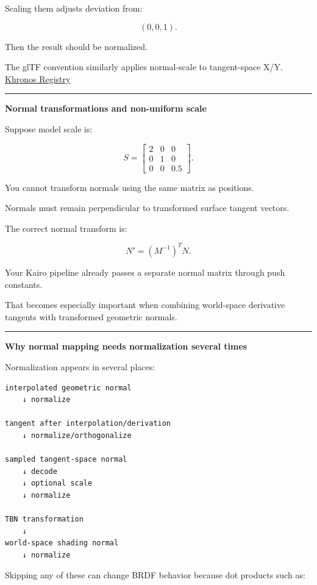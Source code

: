 Scaling them adjusts deviation from:

\[
(0,0,1).
\]

Then the result should be normalized.

The glTF convention similarly applies normal-scale to tangent-space X/Y. \href{https://registry.khronos.org/glTF/specs/2.0/glTF-2.0.html?utm_source=chatgpt.com}{Khronos Registry}

\begin{center}\rule{0.5\linewidth}{0.5pt}\end{center}

\textbf{Normal transformations and non-uniform scale}

Suppose model scale is:

\[
S=
\begin{bmatrix}
2&0&0\\
0&1&0\\
0&0&0.5
\end{bmatrix}.
\]

You cannot transform normals using the same matrix as positions.

Normals must remain perpendicular to transformed surface tangent vectors.

The correct normal transform is:

\[
\boxed{
N'
=
(M^{-1})^T N.
}
\]

Your Kairo pipeline already passes a separate normal matrix through push constants.

That becomes especially important when combining world-space derivative tangents with transformed geometric normals.

\begin{center}\rule{0.5\linewidth}{0.5pt}\end{center}

\textbf{Why normal mapping needs normalization several times}

Normalization appears in several places:

\begin{verbatim}
interpolated geometric normal
    ↓ normalize

tangent after interpolation/derivation
    ↓ normalize/orthogonalize

sampled tangent-space normal
    ↓ decode
    ↓ optional scale
    ↓ normalize

TBN transformation
    ↓
world-space shading normal
    ↓ normalize
\end{verbatim}

Skipping any of these can change BRDF behavior because dot products such as:


